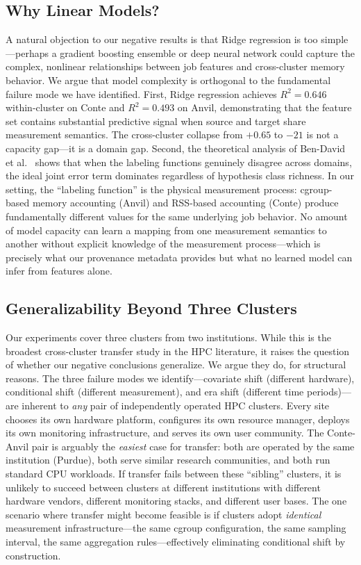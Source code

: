 \documentclass[sigconf]{acmart}
\begin{document}
\subsection{Why Linear Models?}

A natural objection to our negative results is that Ridge regression is too simple---perhaps a gradient boosting ensemble or deep neural network could capture the complex, nonlinear relationships between job features and cross-cluster memory behavior.
We argue that model complexity is orthogonal to the fundamental failure mode we have identified.
First, Ridge regression achieves $R^2 = 0.646$ within-cluster on Conte and $R^2 = 0.493$ on Anvil, demonstrating that the feature set contains substantial predictive signal when source and target share measurement semantics.
The cross-cluster collapse from $+0.65$ to $-21$ is not a capacity gap---it is a domain gap.
Second, the theoretical analysis of Ben-David et al.~\cite{ben_david2010theory} shows that when the labeling functions genuinely disagree across domains, the ideal joint error term dominates regardless of hypothesis class richness.
In our setting, the ``labeling function'' is the physical measurement process: cgroup-based memory accounting (Anvil) and RSS-based accounting (Conte) produce fundamentally different values for the same underlying job behavior.
No amount of model capacity can learn a mapping from one measurement semantics to another without explicit knowledge of the measurement process---which is precisely what our provenance metadata provides but what no learned model can infer from features alone.

\subsection{Generalizability Beyond Three Clusters}

Our experiments cover three clusters from two institutions.
While this is the broadest cross-cluster transfer study in the HPC literature, it raises the question of whether our negative conclusions generalize.
We argue they do, for structural reasons.
The three failure modes we identify---covariate shift (different hardware), conditional shift (different measurement), and era shift (different time periods)---are inherent to \emph{any} pair of independently operated HPC clusters.
Every site chooses its own hardware platform, configures its own resource manager, deploys its own monitoring infrastructure, and serves its own user community.
The Conte-Anvil pair is arguably the \emph{easiest} case for transfer: both are operated by the same institution (Purdue), both serve similar research communities, and both run standard CPU workloads.
If transfer fails between these ``sibling'' clusters, it is unlikely to succeed between clusters at different institutions with different hardware vendors, different monitoring stacks, and different user bases.
The one scenario where transfer might become feasible is if clusters adopt \emph{identical} measurement infrastructure---the same cgroup configuration, the same sampling interval, the same aggregation rules---effectively eliminating conditional shift by construction.
\end{document}
